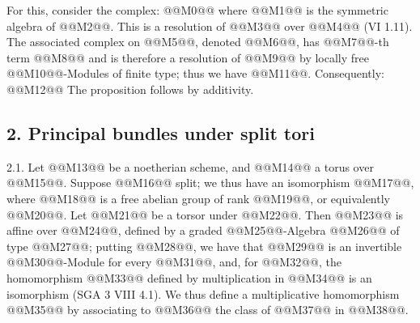 For this, consider the complex:
@@M0@@
where @@M1@@ is the symmetric algebra of @@M2@@. This is a resolution of @@M3@@ over @@M4@@ (VI 1.11). The associated complex on @@M5@@, denoted @@M6@@, has @@M7@@-th term @@M8@@ and is therefore a resolution of @@M9@@ by locally free @@M10@@-Modules of finite type; thus we have @@M11@@. Consequently:
@@M12@@
The proposition follows by additivity.

\subsection*{2. Principal bundles under split tori}

2.1. Let @@M13@@ be a noetherian scheme, and @@M14@@ a torus over @@M15@@. Suppose @@M16@@ split; we thus have an isomorphism @@M17@@, where @@M18@@ is a free abelian group of rank @@M19@@, or equivalently @@M20@@. Let @@M21@@ be a torsor under @@M22@@. Then @@M23@@ is affine over @@M24@@, defined by a graded @@M25@@-Algebra @@M26@@ of type @@M27@@; putting @@M28@@, we have that @@M29@@ is an invertible @@M30@@-Module for every @@M31@@, and, for @@M32@@, the homomorphism @@M33@@ defined by multiplication in @@M34@@ is an isomorphism (SGA 3 VIII 4.1). We thus define a multiplicative homomorphism @@M35@@ by associating to @@M36@@ the class of @@M37@@ in @@M38@@.
